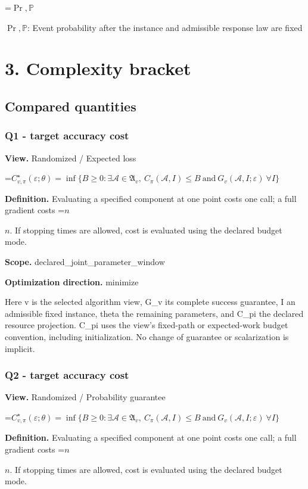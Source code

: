 \documentclass[10pt,a4paper]{article}
\newcommand{\AtlasMath}[1]{\par\begingroup\centering\setbox0=\hbox{$\displaystyle #1$}\ifdim\wd0>1.4\linewidth\typeout{ATLAS WIDE FORMULA: \the\wd0}\fi\ifdim\wd0>\linewidth\resizebox{\linewidth}{!}{\box0}\else\box0\fi\par\endgroup}
\newcommand{\AtlasInlineMath}[1]{\begingroup\setbox0=\hbox{$#1$}\ifdim\wd0>.4\linewidth\endgroup\AtlasMath{#1}\else\endgroup$#1$\fi}
\begin{document}
\AtlasInlineMath{\Pr,\mathbb{P}}: Event probability after the instance and admissible response law are fixed

\section{3. Complexity bracket}
\subsection{Compared quantities}
\subsubsection{Q1 - target accuracy cost}
\textbf{View.} Randomized / Expected loss

\AtlasMath{C^\star_{v,\pi}(\varepsilon;\theta)=\inf\{B\ge0:\exists\mathcal A\in\mathfrak A_v,\ C_\pi(\mathcal A,I)\le B\ \text{and}\ G_v(\mathcal A,I;\varepsilon)\ \forall I\}}
\textbf{Definition.} Evaluating a specified component at one point costs one call; a full gradient costs \AtlasInlineMath{n}. If stopping times are allowed, cost is evaluated using the declared budget mode.

\textbf{Scope.} declared\_joint\_parameter\_window

\textbf{Optimization direction.} minimize

Here v is the selected algorithm view, G\_v its complete success guarantee, I an admissible fixed instance, theta the remaining parameters, and C\_pi the declared resource projection. C\_pi uses the view's fixed-path or expected-work budget convention, including initialization. No change of guarantee or scalarization is implicit.

\subsubsection{Q2 - target accuracy cost}
\textbf{View.} Randomized / Probability guarantee

\AtlasMath{C^\star_{v,\pi}(\varepsilon;\theta)=\inf\{B\ge0:\exists\mathcal A\in\mathfrak A_v,\ C_\pi(\mathcal A,I)\le B\ \text{and}\ G_v(\mathcal A,I;\varepsilon)\ \forall I\}}
\textbf{Definition.} Evaluating a specified component at one point costs one call; a full gradient costs \AtlasInlineMath{n}. If stopping times are allowed, cost is evaluated using the declared budget mode.
\end{document}
